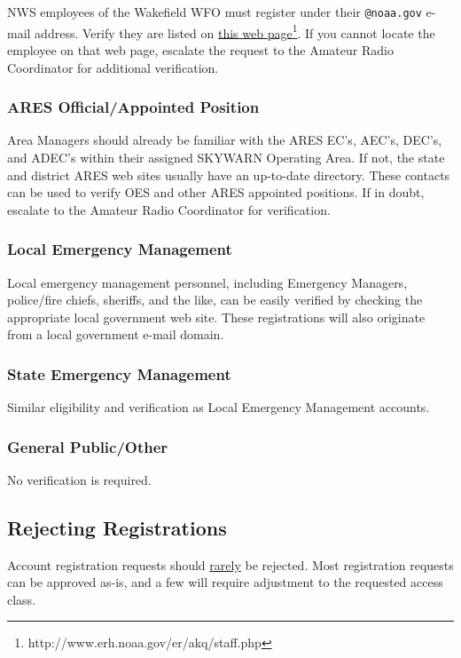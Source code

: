 \documentclass[pdflatex,letterpaper,twoside,12pt]{book}
\begin{document}
NWS employees of the Wakefield WFO must register under their \verb|@noaa.gov| e-mail address.  Verify they are listed on \href{http://www.erh.noaa.gov/er/akq/staff.php}{this web page\footnote{http://www.erh.noaa.gov/er/akq/staff.php}}.  If you cannot locate the employee on that web page, escalate the request to the Amateur Radio Coordinator for additional verification.

\subsubsection{ARES Official/Appointed Position}

Area Managers should already be familiar with the ARES EC's, AEC's, DEC's, and ADEC's within their assigned SKYWARN Operating Area.  If not, the state and district ARES web sites usually have an up-to-date directory.  These contacts can be used to verify OES and other ARES appointed positions.  If in doubt, escalate to the Amateur Radio Coordinator for verification.

\subsubsection{Local Emergency Management}

Local emergency management personnel, including Emergency Managers, police/fire chiefs, sheriffs, and the like, can be easily verified by checking the appropriate local government web site.  These registrations will also originate from a local government e-mail domain.

\subsubsection{State Emergency Management}

Similar eligibility and verification as Local Emergency Management accounts.

\subsubsection{General Public/Other}

No verification is required.

\subsection{Rejecting Registrations}

Account registration requests should \underline{rarely} be rejected.  Most registration requests can be approved as-is, and a few will require adjustment to the requested access class.
\end{document}
